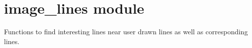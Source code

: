 \documentclass[letterpaper,10pt,english]{sphinxmanual}
\begin{document}
\chapter{image\_lines module}
\label{\detokenize{image_lines:image-lines-module}}\label{\detokenize{image_lines:module-image_lines}}\label{\detokenize{image_lines::doc}}
Functions to find interesting lines near user drawn lines as well as
corresponding lines.

\begin{fulllineitems}
\label{\detokenize{image_lines:image_lines.center_of_line}}
\end{fulllineitems}

\end{document}

